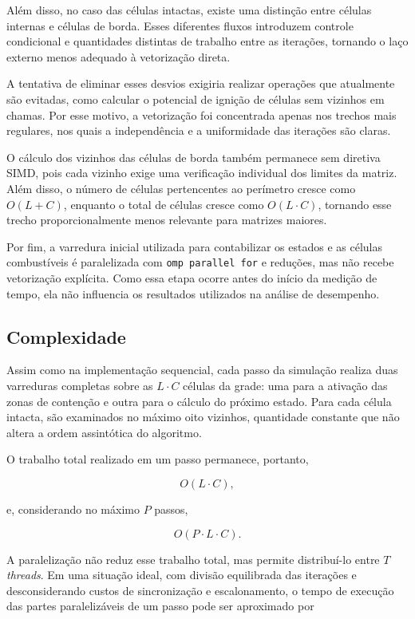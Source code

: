 \documentclass[11pt,a4paper]{article}
\begin{document}
Além disso, no caso das células intactas, existe uma distinção entre células internas e células de borda. Esses diferentes fluxos introduzem controle condicional e quantidades distintas de trabalho entre as iterações, tornando o laço externo menos adequado à vetorização direta.

A tentativa de eliminar esses desvios exigiria realizar operações que atualmente são evitadas, como calcular o potencial de ignição de células sem vizinhos em chamas. Por esse motivo, a vetorização foi concentrada apenas nos trechos mais regulares, nos quais a independência e a uniformidade das iterações são claras.

O cálculo dos vizinhos das células de borda também permanece sem diretiva SIMD, pois cada vizinho exige uma verificação individual dos limites da matriz. Além disso, o número de células pertencentes ao perímetro cresce como $O(L+C)$, enquanto o total de células cresce como $O(L \cdot C)$, tornando esse trecho proporcionalmente menos relevante para matrizes maiores.

Por fim, a varredura inicial utilizada para contabilizar os estados e as células combustíveis é paralelizada com \texttt{omp parallel for} e reduções, mas não recebe vetorização explícita. Como essa etapa ocorre antes do início da medição de tempo, ela não influencia os resultados utilizados na análise de desempenho.

\subsection{Complexidade}

Assim como na implementação sequencial, cada passo da simulação realiza duas varreduras completas sobre as $L \cdot C$ células da grade: uma para a ativação das zonas de contenção e outra para o cálculo do próximo estado. Para cada célula intacta, são examinados no máximo oito vizinhos, quantidade constante que não altera a ordem assintótica do algoritmo.

O trabalho total realizado em um passo permanece, portanto,

$$
O(L \cdot C),
$$

e, considerando no máximo $P$ passos,

$$
O(P \cdot L \cdot C).
$$

A paralelização não reduz esse trabalho total, mas permite distribuí-lo entre $T$ \emph{threads}. Em uma situação ideal, com divisão equilibrada das iterações e desconsiderando custos de sincronização e escalonamento, o tempo de execução das partes paralelizáveis de um passo pode ser aproximado por
\end{document}
